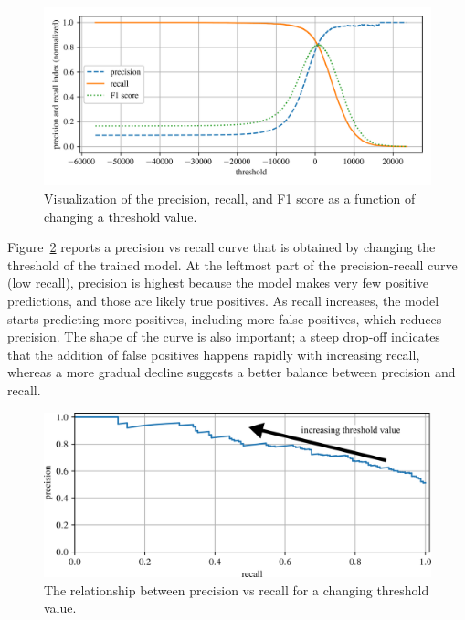 \documentclass[12pt,letter]{article}
\begin{document}
\begin{figure}[H]
    \centering
    \includegraphics[width=6.5in]{../figures/F1_score_plot.png}
    \caption{Visualization of the precision, recall, and F1 score as a function of changing a threshold value. }
    \label{fig:F1_score_plot}
\end{figure}





Figure~\ref{fig:precision_vs_recall} reports a precision vs recall curve that is obtained by changing the threshold of the trained model. At the leftmost part of the precision-recall curve (low recall), precision is highest because the model makes very few positive predictions, and those are likely true positives. As recall increases, the model starts predicting more positives, including more false positives, which reduces precision. The shape of the curve is also important; a steep drop-off indicates that the addition of false positives happens rapidly with increasing recall, whereas a more gradual decline suggests a better balance between precision and recall.

		\begin{figure}[H]
			\centering
			\includegraphics[width=6in]{../figures/precision_recall_curve}
			\caption{The relationship between precision vs recall for a changing threshold value.}
			\label{fig:precision_vs_recall}
		\end{figure}
\end{document}
